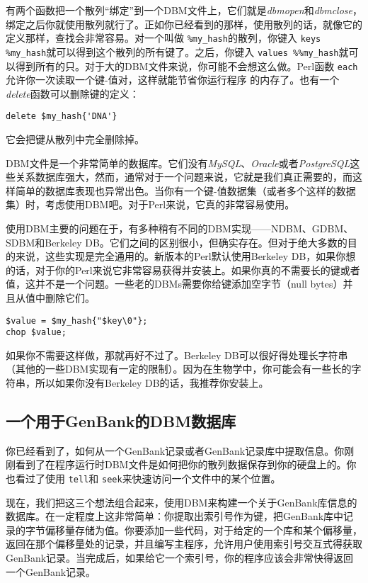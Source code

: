 有两个函数把一个散列“绑定”到一个DBM文件上，它们就是\textit{dbmopen}和\textit{dbmclose}，绑定之后你就使用散列就行了。正如你已经看到的那样，使用散列的话，就像它的定义那样，查找会非常容易。对一个叫做 \verb|%my_hash|的散列，你键入 \verb|keys %my_hash|就可以得到这个散列的所有键了。之后，你键入 \verb|values %%my_hash|就可以得到所有的只。对于大的DBM文件来说，你可能不会想这么做。Perl函数 \verb|each|允许你一次读取一个键-值对，这样就能节省你运行程序 的内存了。也有一个\textit{delete}函数可以删除键的定义：

\begin{lstlisting}
delete $my_hash{'DNA'}
\end{lstlisting}

它会把键从散列中完全删除掉。

DBM文件是一个非常简单的数据库。它们没有\textit{MySQL}、\textit{Oracle}或者\textit{PostgreSQL}这些关系数据库强大，然而，通常对于一个问题来说，它就是我们真正需要的，而这样简单的数据库表现也异常出色。当你有一个键-值数据集（或者多个这样的数据集）时，考虑使用DBM吧。对于Perl来说，它真的非常容易使用。

使用DBM主要的问题在于，有多种稍有不同的DBM实现——NDBM、GDBM、SDBM和Berkeley DB。它们之间的区别很小，但确实存在。但对于绝大多数的目的来说，这些实现是完全通用的。新版本的Perl默认使用Berkeley DB，如果你想的话，对于你的Perl来说它非常容易获得并安装上。如果你真的不需要长的键或者值，这并不是一个问题。一些老的DBMs需要你给键添加空字节（null bytes）并且从值中删除它们。

\begin{lstlisting}
$value = $my_hash{"$key\0"};
chop $value;
\end{lstlisting}

如果你不需要这样做，那就再好不过了。Berkeley DB可以很好得处理长字符串（其他的一些DBM实现有一定的限制）。因为在生物学中，你可能会有一些长的字符串，所以如果你没有Berkeley DB的话，我推荐你安装上。

\subsection{一个用于GenBank的DBM数据库}
你已经看到了，如何从一个GenBank记录或者GenBank记录库中提取信息。你刚刚看到了在程序运行时DBM文件是如何把你的散列数据保存到你的硬盘上的。你也看过了使用 \verb|tell|和 \verb|seek|来快速访问一个文件中的某个位置。

现在，我们把这三个想法组合起来，使用DBM来构建一个关于GenBank库信息的数据库。在一定程度上这非常简单：你提取出索引号作为键，把GenBank库中记录的字节偏移量存储为值。你要添加一些代码，对于给定的一个库和某个偏移量，返回在那个偏移量处的记录，并且编写主程序，允许用户使用索引号交互式得获取GenBank记录。当完成后，如果给它一个索引号，你的程序应该会非常快得返回一个GenBank记录。

